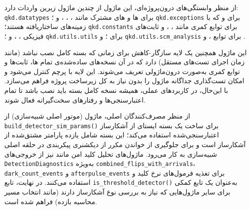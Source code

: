 از منظر وابستگی‌های درون‌پروژه‌ای، این ماژول از چندین ماژول زیرین واردات دارد: \texttt{qkd.datatypes} برای ها و های مشترک مانند ، ، ،  و ؛ \texttt{qkd.exceptions} برای  و  که با زمینه‌های ساختاریافته  هستند؛ \texttt{qkd.constants} برای توابع کمری مانند ، ،  و ثابت‌های فیزیکی ، ،  و ؛ \texttt{qkd.utils.utils} برای ؛ و \texttt{qkd.utils.scm\_analysis} برای توابع ،  و .

این ماژول همچنین یک لایه سازگار-کاهش  برای زمانی که بسته  کامل نصب نباشد (مانند زمان اجرای تست‌های مستقل) دارد که در آن نسخه‌های ساده‌شده‌ی تمام ها، ثابت‌ها و توابع کمری به‌صورت درون‌ماژولی تعریف می‌شوند. این لایه با پرچم  کنترل می‌شود و امکان تست‌گذاری جداگانه ماژول را بدون نیاز به کل زیرساخت پروژه فراهم می‌سازد. با این‌حال، در کاربردهای عملی، همیشه نسخه کامل بسته  باید نصب باشد تا تمام اعتبارسنجی‌ها و رفتارهای سخت‌گیرانه فعال شوند.

از منظر مصرف‌کنندگان اصلی، ماژول  (موتور اصلی شبیه‌سازی) از \texttt{build\_detector\_sim\_params()} برای ساخت یک بسته ایستای  از آشکارساز اعتبارسنجی‌شده استفاده می‌کند؛ این بسته شامل یازده پارامتر مشتق‌شده از آشکارساز است و برای جلوگیری از خواندن مکرر از دیکشنری پیکربندی در حلقه اصلی شبیه‌سازی به کار می‌رود. ماژول‌های تحلیل کلید امن مانند  نیز از خروجی‌های \texttt{DetectionDiagnostics} به‌ویژه \texttt{combined\_flips\_with\_arrivals}، \texttt{dark\_count\_events} و \texttt{afterpulse\_events} برای تغذیه فرمول‌های نرخ کلید  و  استفاده می‌کنند. در نهایت، تابع \texttt{is\_threshold\_detector()} به‌عنوان یک تابع کمکی برای سایر ماژول‌هایی که نیاز به بررسی نوع آشکارساز دارند (مانند انتخاب مسیر محاسبه بازده) فراهم شده است.


